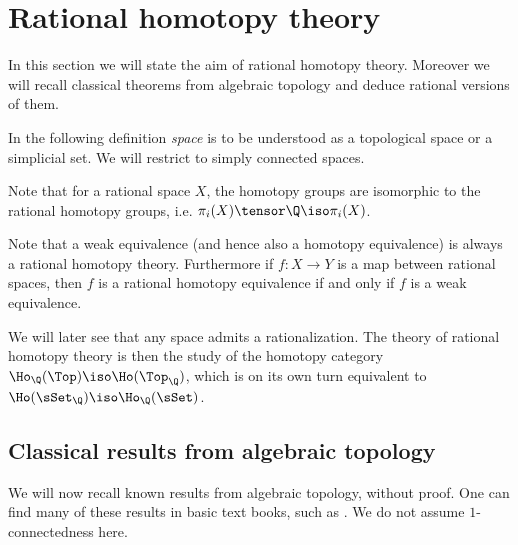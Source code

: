 
\section{Rational homotopy theory}
\label{sec:basics}

In this section we will state the aim of rational homotopy theory. Moreover we will recall classical theorems from algebraic topology and deduce rational versions of them.

In the following definition \emph{space} is to be understood as a topological space or a simplicial set. We will restrict to simply connected spaces.



Note that for a rational space $X$, the homotopy groups are isomorphic to the rational homotopy groups, i.e. $\pi_i(X) \tensor \Q \iso \pi_i(X)$.



Note that a weak equivalence (and hence also a homotopy equivalence) is always a rational homotopy theory. Furthermore if $f: X \to Y$ is a map between rational spaces, then $f$ is a rational homotopy equivalence if and only if $f$ is a weak equivalence.

We will later see that any space admits a rationalization. The theory of rational homotopy theory is then the study of the homotopy category $\Ho_\Q(\Top) \iso \Ho(\Top_\Q)$, which is on its own turn equivalent to $\Ho(\sSet_\Q) \iso \Ho_\Q(\sSet)$.

\subsection{Classical results from algebraic topology}

We will now recall known results from algebraic topology, without proof. One can find many of these results in basic text books, such as \cite{may, dold}. We do not assume $1$-connectedness here.

